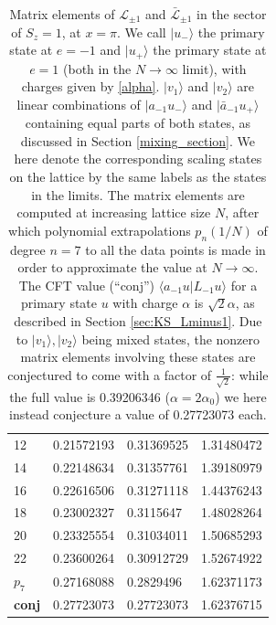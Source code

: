 \documentclass[a4paper,10pt]{article}
\newcommand{\jesper}[1]{$\framebox{\tiny J}$\ \textbf{\texttt{{\color{cyan}\footnotesize#1}}}}
\newcommand{\KSgen}{\mathcal{L}}
\begin{document}
\begin{table}[H]
\begin{minipage}{0.5\linewidth}
\begin{tabular}{llll}
12 & 0.21572193 & 0.31369525 & 1.31480472 \\
14 & 0.22148634 & 0.31357761 & 1.39180979 \\
16 & 0.22616506 & 0.31271118 & 1.44376243 \\
18 & 0.23002327 & 0.3115647 & 1.48028264 \\
20 & 0.23325554 & 0.31034011 & 1.50685293 \\
22 & 0.23600264 & 0.30912729 & 1.52674922 \\
$p_{7}$ & 0.27168088 & 0.2829496 & 1.62371173 \\
\bf{conj}  & 0.27723073 & 0.27723073 & 1.62376715 \\
\hline
\end{tabular}
\end{minipage}%

\caption{Matrix elements of $\KSgen_{\pm 1}$ and $\bar{\KSgen}_{\pm 1}$ in the sector of $S_z=1$, at $x=\pi$. We call $|u_-\rangle$ the primary state at $e=-1$ and $|u_+\rangle$ the primary state at $e=1$ (both in the $N\to\infty$ limit), with charges given by \eqref{alpha}. $|v_1\rangle$ and $|v_2\rangle$ are linear combinations of $|a_{-1} u_-\rangle $ and $|\bar{a}_{-1} u_+\rangle$ containing equal parts of both states, as discussed in Section \ref{mixing_section}. We here denote the corresponding scaling states on the lattice by the same labels as the states in the limits. 
%
%
The matrix elements are computed at increasing lattice size $N$, after which polynomial extrapolations $p_n(1/N)$ of degree $n= 7$ to all the data points is made in order to approximate the value at $N \rightarrow \infty$. The CFT value (``conj'') $\langle a_{-1}u|L_{-1}u\rangle$ for a primary state $u$ with charge $\alpha$ is $\sqrt{2}\alpha$, as described in Section \ref{sec:KS_Lminus1}. Due to $|v_1\rangle,|v_2\rangle$ being mixed states, the nonzero matrix elements involving these states are conjectured to come with a factor of $\frac{1}{\sqrt{2}}$: while the full value is 0.39206346 ($\alpha=2\alpha_0$) we here instead conjecture a value of 0.27723073 each. %
%
%
}
\label{ED_comparisons}
\end{table}
\end{document}
